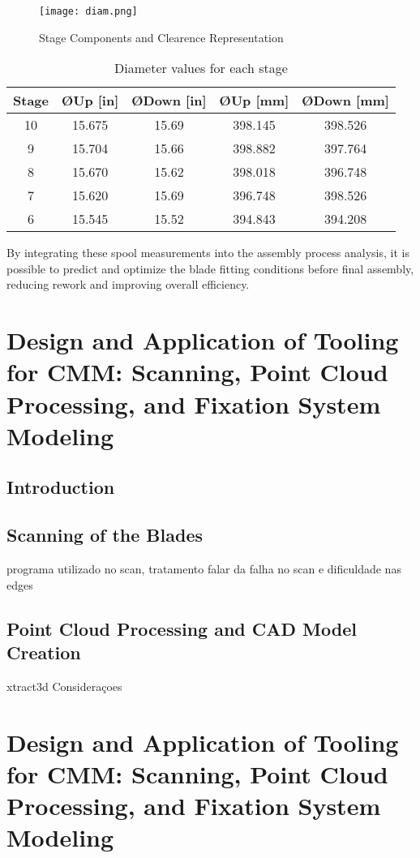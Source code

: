 \begin{figure}[H]
    \centering
    \texttt{[image: diam.png]}
    \caption{Stage Components and Clearence Representation}
    \label{fig:diam.png}
\end{figure}


\begin{table}[h]
    \centering
    \begin{tabular}{|c|c|c|c|c|}
        \hline
        Stage & ØUp [in] & ØDown [in] & ØUp [mm] & ØDown [mm]\\
        \hline
        10 & 15.675 & 15.69 & 398.145 & 398.526 \\
        9  & 15.704 & 15.66 & 398.882 & 397.764 \\
        8  & 15.670 & 15.62 & 398.018 & 396.748 \\
        7  & 15.620 & 15.69 & 396.748 & 398.526 \\
        6  & 15.545 & 15.52 & 394.843 & 394.208 \\
        \hline
    \end{tabular}
    \caption{Diameter values for each stage}
    \label{tab:diameters}
\end{table}

By integrating these spool measurements into the assembly process analysis, it is possible to predict and optimize the blade fitting conditions before final assembly, reducing rework and improving overall efficiency.

\chapter{Design and Application of Tooling for CMM: Scanning, Point Cloud Processing, and Fixation System Modeling}
\label{cha:digi}

\section{Introduction}
\label{sec:intro2}


\section{Scanning of the Blades}
\label{sec:scan}

programa utilizado no scan, tratamento 
falar da falha no scan e dificuldade nas edges

\section{Point Cloud Processing and CAD Model Creation}
\label{sec:cad}

xtract3d 
Consideraçoes


\chapter{Design and Application of Tooling for CMM: Scanning, Point Cloud Processing, and Fixation System Modeling}
\label{cha:dig}










